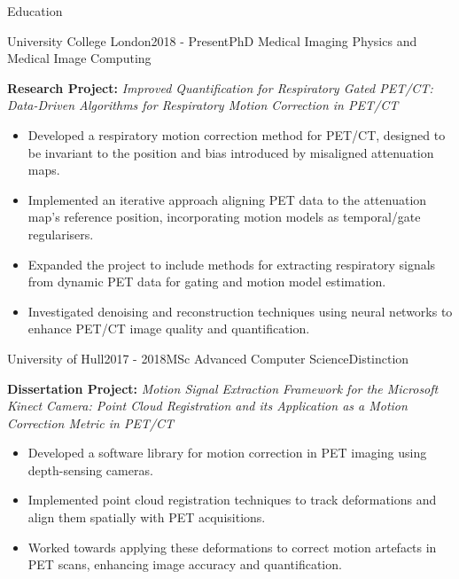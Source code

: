 \documentclass{cv}
\begin{document}
    \begin{rSection}{Education}
        \item \begin{rSubsection}{University College London}{2018 - Present}{PhD Medical Imaging Physics and Medical Image Computing}{}            
            \item \textbf{Research Project:} \textit{Improved Quantification for Respiratory Gated PET/CT: Data-Driven Algorithms for Respiratory Motion Correction in PET/CT}
            
            \item \begin{itemize}
                \item Developed a respiratory motion correction method for PET/CT, designed to be invariant to the position and bias introduced by misaligned attenuation maps.
                \item Implemented an iterative approach aligning PET data to the attenuation map’s reference position, incorporating motion models as temporal/gate regularisers.
                \item Expanded the project to include methods for extracting respiratory signals from dynamic PET data for gating and motion model estimation.
                \item Investigated denoising and reconstruction techniques using neural networks to enhance PET/CT image quality and quantification.
            \end{itemize}
        \end{rSubsection}
        
        \item \begin{rSubsection}{University of Hull}{2017 - 2018}{MSc Advanced Computer Science}{Distinction}
            \item \textbf{Dissertation Project:} \textit{Motion Signal Extraction Framework for the Microsoft Kinect Camera: Point Cloud Registration and its Application as a Motion Correction Metric in PET/CT}
            
            \item \begin{itemize}
                \item Developed a software library for motion correction in PET imaging using depth-sensing cameras.
                \item Implemented point cloud registration techniques to track deformations and align them spatially with PET acquisitions.
                \item Worked towards applying these deformations to correct motion artefacts in PET scans, enhancing image accuracy and quantification.
            \end{itemize}
        \end{rSubsection}
        

\end{rSection}
\end{document}
